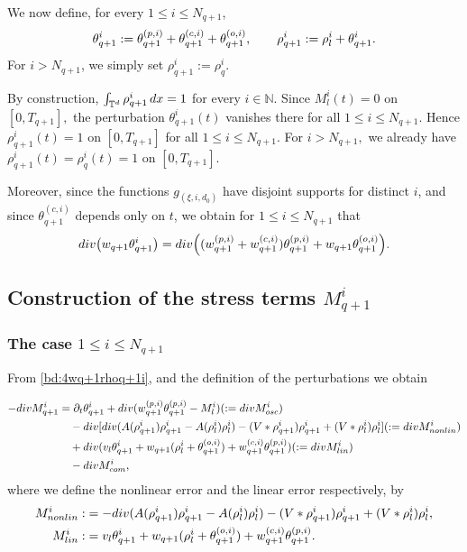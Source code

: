\documentclass[10pt,a4paper]{amsart}
\numberwithin{equation}{section}
\def\dif{{\mathord{{\rm d}}}}
\def\leq{\leqslant}
\def\div{\mathord{{\rm div}}}
\def\dif{{\mathord{{\rm d}}}}
\def\leq{\leqslant}
\def\div{\mathord{{\rm div}}}
\begin{document}
We now define, for every $1\leq i\leq N_{q+1}$,
\begin{align}
\theta_{q+1}^i
:=
\theta_{q+1}^{(p,i)}
+
\theta_{q+1}^{(c,i)}
+
\theta_{q+1}^{(o,i)},
\qquad
\rho_{q+1}^i
:=
\rho_l^i+\theta_{q+1}^i.
\notag
\end{align}
For $i>N_{q+1}$, we simply set
$
\rho_{q+1}^i:=\rho_q^i.
$

By construction,
$
\int_{\mathbb{T}^d}\rho_{q+1}^i\,\dif x=1
$
for every $i\in\mathbb{N}$.
Since
$
M_l^i(t)=0
$
on
$
[0,T_{q+1}],
$
the perturbation $\theta_{q+1}^i(t)$ vanishes there for all
$
1\leq i\leq N_{q+1}.
$
Hence
$
\rho_{q+1}^i(t)=1
$
on
$
[0,T_{q+1}]
$
for all
$
1\leq i\leq N_{q+1}.
$
For
$
i>N_{q+1},
$
we already have
$
\rho_{q+1}^i(t)
=
\rho_q^i(t)
=
1
$
on
$
[0,T_{q+1}].
$

Moreover, since the functions
$
g_{(\xi,i,d_0)}
$
have disjoint supports for distinct $i$, and since
$
\theta_{q+1}^{(c,i)}
$
depends only on $t$, we obtain for
$
1\leq i\leq N_{q+1}
$
that
\begin{align}
\div\bigl(
w_{q+1}\theta_{q+1}^i
\bigr)
=
\div\Bigl(
(w_{q+1}^{(p,i)}+w_{q+1}^{(c,i)})
\theta_{q+1}^{(p,i)}
+
w_{q+1}\theta_{q+1}^{(o,i)}
\Bigr).
\label{bd:4wq+1rhoq+1i}
\end{align}

 


\subsection{Construction of the stress terms $M^{i}_{q+1}$}\label{sec:4defmq+1}

\subsubsection{The case $1\leq i\leq N_{q+1}$} 
From \eqref{bd:4wq+1rhoq+1i}, and the definition of the perturbations 
we obtain

\begin{align*}
 -\div M^{i}_{q+1}&=\partial_t\theta_{q+1}^i+\div (w_{q+1}^{(p,i)}\theta_{q+1}^{(p,i)}-M^{i}_l)(:=\div M^{i}_{osc})\\
 &\quad-\div[ \div( A(\rho^{i}_{q+1})\rho^{i}_{q+1}-A(\rho^{i}_{l}) \rho^{i}_{l})-(V*\rho_{q+1}^i)\rho_{q+1}^i+(V*\rho_{l}^i)\rho_{l}^i](:=\div M^{i}_{nonlin})\notag\\ 
 &\quad+\div(v_l\theta^{i}_{q+1}+w_{q+1}(\rho^{i}_l+\theta_{q+1}^{(o,i)})+w_{q+1}^{(c,i)}\theta_{q+1}^{(p,i)})(:=\div M^{i}_{lin})\\
&\quad -\div M_{com}^i,
\end{align*}
where we define the nonlinear error and the linear error  respectively, by
\begin{align*} 
M^{i}_{nonlin}:&= -\div( A(\rho^{i}_{q+1}) \rho^{i}_{q+1}-A(\rho^{i}_{l}) \rho^{i}_{l} )-(V*\rho_{q+1}^i)\rho_{q+1}^i+(V*\rho_{l}^i)\rho_{l}^i,\\
M^{i}_{lin}:&=v_l\theta^{i}_{q+1}+w_{q+1}(\rho^{i}_l+\theta_{q+1}^{(o,i)}) +w_{q+1}^{(c,i)}\theta_{q+1}^{(p,i)}.
\end{align*}
\end{document}
